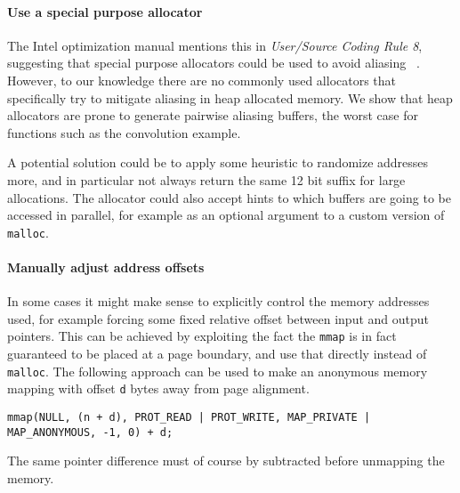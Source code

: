 \documentclass{acm_proc_article-sp}
\begin{document}
\paragraph{Use a special purpose allocator}
The Intel optimization manual mentions this in \emph{User/Source Coding Rule 8}, suggesting that special purpose allocators could be used to avoid aliasing ~\cite{OptimizationManual}.
However, to our knowledge there are no commonly used allocators that specifically try to mitigate aliasing in heap allocated memory.
We show that heap allocators are prone to generate pairwise aliasing buffers, the worst case for functions such as the convolution example.

A potential solution could be to apply some heuristic to randomize addresses more, and in particular not always return the same 12 bit suffix for large allocations.
The allocator could also accept hints to which buffers are going to be accessed in parallel, for example as an optional argument to a custom version of \texttt{malloc}.

\paragraph{Manually adjust address offsets}
In some cases it might make sense to explicitly control the memory addresses used, for example forcing some fixed relative offset between input and output pointers.
This can be achieved by exploiting the fact the \texttt{mmap} is in fact guaranteed to be placed at a page boundary, and use that directly instead of \texttt{malloc}.
The following approach can be used to make an anonymous memory mapping with offset \texttt{d} bytes away from page alignment.
\begin{lstlisting}[breaklines=true]
    mmap(NULL, (n + d), PROT_READ | PROT_WRITE, MAP_PRIVATE | MAP_ANONYMOUS, -1, 0) + d;
\end{lstlisting}
The same pointer difference must of course by subtracted before unmapping the memory.
\end{document}
